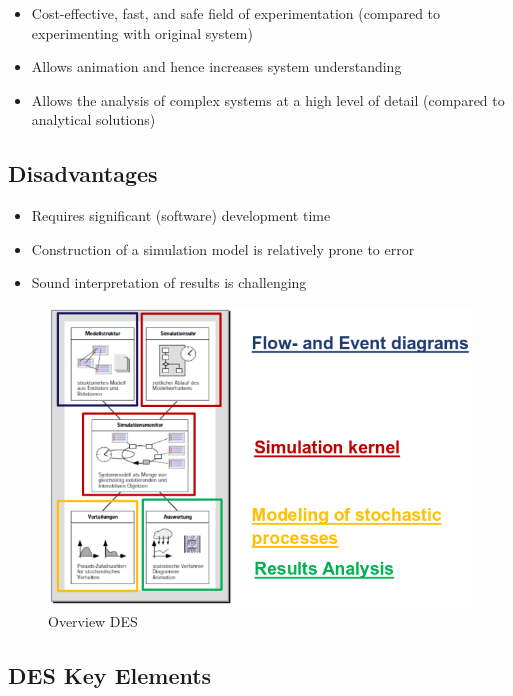 \begin{itemize}
\tightlist
\item
  Cost-effective, fast, and safe field of experimentation (compared to
  experimenting with original system)
\item
  Allows animation and hence increases system understanding
\item
  Allows the analysis of complex systems at a high level of detail
  (compared to analytical solutions)
\end{itemize}

\hypertarget{disadvantages}{%
\subsection{Disadvantages}\label{disadvantages}}

\begin{itemize}
\tightlist
\item
  Requires significant (software) development time
\item
  Construction of a simulation model is relatively prone to error
\item
  Sound interpretation of results is challenging
\end{itemize}

\begin{figure}
\centering
\includegraphics{figures/overviewDES.png}
\caption{Overview DES}
\end{figure}

\hypertarget{des-key-elements}{%
\subsection{DES Key Elements}\label{des-key-elements}}


